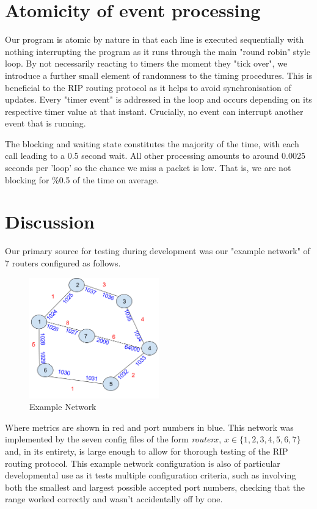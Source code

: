 \documentclass[12pt,twoside]{article}
\begin{document}
\section{Atomicity of event processing}

Our program is atomic by nature in that each line is executed sequentially with nothing interrupting the program as it runs through the main "round robin" style loop. By not necessarily reacting to timers the moment they "tick over", we introduce a further small element of randomness to the timing procedures. This is beneficial to the RIP routing protocol as it helps to avoid synchronisation of updates. Every "timer event" is addressed in the loop and occurs depending on its respective timer value at that instant. Crucially, no event can interrupt another event that is running.

The blocking and waiting state constitutes the majority of the time, with each call leading to a 0.5 second wait. All other processing amounts to around 0.0025 seconds  per 'loop' so the chance we miss a packet is low. That is, we are not blocking for \%0.5 of the time on average. %

\section{Discussion}
Our primary source for testing during development was our "example network" of 7 routers configured as follows.

\begin{figure}[htpb]
	\centering
	\includegraphics[width=0.5\textwidth]{Topology_Pic.png} %
	\caption{Example Network}
\end{figure}%



Where metrics are shown in red and port numbers in blue. This network was implemented by the seven config files of the form \textit{router$x$}, $x\in \{1,2,3,4,5,6,7\}$ and, in its entirety, is large enough to allow for thorough testing of the RIP routing protocol. This example network configuration is also of particular developmental use as it tests multiple configuration criteria, such as involving both the smallest and largest possible accepted port numbers, checking that the range worked correctly and wasn't accidentally off by one.
\end{document}

